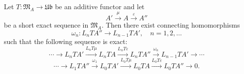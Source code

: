 \begin{theorem}
Let $T: \mathfrak{M}_A \rightarrow \mathfrak{Ub}$ be an additive functor and let
\[
A' \xrightarrow{\mu} A \xrightarrow{\varepsilon} A''
\]
be a short exact sequence in $\mathfrak{M}_A$. Then there exist connecting homomorphisms
\[
\omega_n: L_n T A'' \rightarrow L_{n-1} T A', \quad n = 1, 2, \ldots
\]
such that the following sequence is exact:
\[
\cdots \rightarrow L_n T A' \xrightarrow{L_n T \mu} L_n T A \xrightarrow{L_n T \varepsilon} L_n T A'' \xrightarrow{\omega_n} L_{n-1} T A' \rightarrow \cdots
\]
\[
\cdots \rightarrow L_1 T A'' \xrightarrow{\omega_1} L_0 T A' \xrightarrow{L_0 T \mu} L_0 T A \xrightarrow{L_0 T \varepsilon} L_0 T A'' \rightarrow 0.
\]
\end{theorem}
